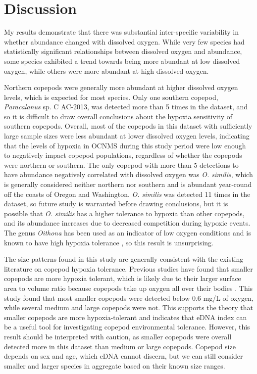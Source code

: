 \documentclass[12pt,twoside]{reedthesis}
\begin{document}
	
	\chapter{Discussion}
	
	My results demonstrate that there was substantial inter-specific variability in whether abundance changed with dissolved oxygen. While very few species had statistically significant relationships between dissolved oxygen and abundance, some species exhibited a trend towards being more abundant at low dissolved oxygen, while others were more abundant at high dissolved oxygen. 
	
	Northern copepods were generally more abundant at higher dissolved oxygen levels, which is expected for most species. Only one southern copepod, \textit{Paracalanus} sp. C AC-2013, was detected more than 5 times in the dataset, and so it is difficult to draw overall conclusions about the hypoxia sensitivity of southern copepods. Overall, most of the copepods in this dataset with sufficiently large sample sizes were less abundant at lower dissolved oxygen levels, indicating that the levels of hypoxia in OCNMS during this study period were low enough to negatively impact copepod populations, regardless of whether the copepods were northern or southern. The only copepod with more than 5 detections to have abundance negatively correlated with dissolved oxygen was \textit{O. similis}, which is generally considered neither northern nor southern and is abundant year-round off the coasts of Oregon and Washington. \textit{O. similis} was detected 11 times in the dataset, so future study is warranted before drawing conclusions, but it is possible that \textit{O. similis} has a higher tolerance to hypoxia than other copepods, and its abundance increases due to decreased competition during hypoxic events. The genus \textit{Oithona} has been used as an indicator of low oxygen conditions \autocite{Richard2001} and is known to have high hypoxia tolerance \autocite{Roman1993}, so this result is unsurprising. 
	
	The size patterns found in this study are generally consistent with the existing literature on copepod hypoxia tolerance. Previous studies have found that smaller copepods are more hypoxia tolerant, which is likely due to their larger surface area to volume ratio because copepods take up oxygen all over their bodies \autocite{Portner2010, Roman2019}. This study found that most smaller copepods were detected below 0.6 mg/L of oxygen, while several medium and large copepods were not. This supports the theory that smaller copepods are more hypoxia-tolerant and indicates that eDNA index can be a useful tool for investigating copepod environmental tolerance. However, this result should be interpreted with caution, as smaller copepods were overall detected more in this dataset than medium or large copepods. Copepod size depends on sex and age, which eDNA cannot discern, but we can still consider smaller and larger species in aggregate based on their known size ranges. 
	
\end{document}
